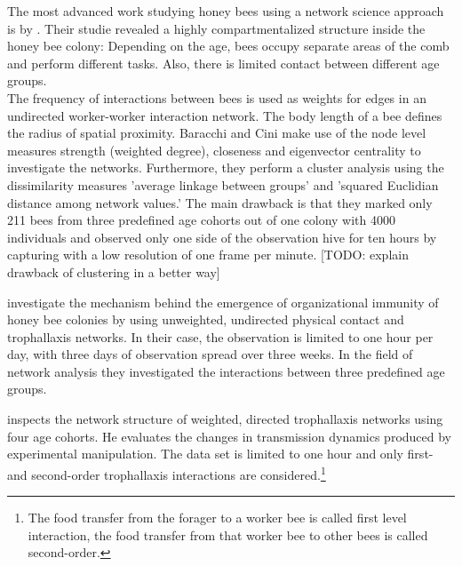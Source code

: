 The most advanced work studying honey bees using a network science approach is by \textcite{baracchi2014socio}.
Their studie revealed a highly compartmentalized structure inside the honey bee colony:
Depending on the age, bees occupy separate areas of the comb and perform different tasks. Also, there is limited contact between different age groups.\\
The frequency of interactions between bees is used as weights for edges in an undirected worker-worker interaction network. The body length of a bee defines the radius of spatial proximity.
Baracchi and Cini make use of the node level measures strength (weighted degree), closeness and eigenvector centrality to investigate the networks.
Furthermore, they perform a cluster analysis using the dissimilarity measures ’average linkage between groups' and ’squared Euclidian distance among network values.'
The main drawback is that they marked only 211 bees from three predefined age cohorts out of one colony with 4000 individuals and observed only one side of the observation hive for ten hours by capturing with a low resolution of one frame per minute. [TODO: explain drawback of clustering in a better way]


\textcite{scholl2011olfactory} investigate the mechanism behind the emergence of organizational immunity of honey bee colonies by using unweighted, undirected physical contact and trophallaxis networks.
In their case, the observation is limited to one hour per day, with three days of observation spread over three weeks.
In the field of network analysis they investigated the interactions between three predefined age groups.


\textcite{naug2008structure} inspects the network structure of weighted, directed trophallaxis networks using four age cohorts. He evaluates the changes in transmission dynamics produced by experimental manipulation.
The data set is limited to one hour and only first- and second-order trophallaxis interactions are considered.\footnote{The food transfer from the forager to a worker bee is called first level interaction, the food transfer from that worker bee to other bees is called second-order.}


